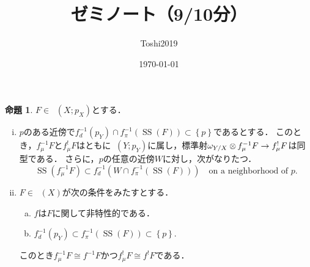 \documentclass[leqno, 10pt, a4paper, dvipdfmx]{jsarticle}
\title{ゼミノート（9/10分）}
\author{Toshi2019}
\date{\today}
\theoremstyle{definition}
\numberwithin{equation}{section}
\newcommand{\Dompb}{\mathop{\mathsf{D}^\mathrm{b}}\nolimits}
\newcommand{\muS}{\mathop{\mathrm{SS}}\nolimits}
\newcommand{\tens}[1][]{\mathbin{\otimes_{\raise1.5ex\hbox to-.1em{}{#1}}}}
\theoremstyle{mystyle}
\newtheorem{PRP}[AXM]{命題}
\renewenvironment{leftbar}{%
  \def\FrameCommand{\textcolor{lightgray}{\vrule width 4pt} \hspace{10pt}}%
  \MakeFramed {\advance\hsize-\width \FrameRestore}}%
{\endMakeFramed}
\newcommand{\mpb}[1][]{{#1}_{\pi}} %
\newcommand{\mdiff}[1][]{{#1}_{d}} %
\newcommand{\muinv}[1][]{{#1}_{\mu}^{-1}} %
\newcommand{\muexinv}[1][]{{#1}_{\mu}^{!}} %
\begin{document}
\maketitle

\begin{leftbar}
\begin{PRP}
    \(F\in\Dompb(X;p_X)\)とする．
\begin{enumerate}[(i)]
    \item \(p\)のある近傍で\(
        \mdiff[f]^{-1}(p_Y)\cap \mpb[f]^{-1}(\muS(F))
        \subset \left\{p\right\}
    \)であるとする．
    このとき，\(\muinv[f]F\)と\(\muexinv[f]F\)はともに\(
        \Dompb(Y;p_Y)
    \)に属し，標準射\(\omega_{Y/X}\tens[]\muinv[f]F\to\muexinv[f]F\)は同型である．
    さらに，\(p\)の任意の近傍\(W\)に対し，次がなりたつ．
    \begin{equation}\label{eq:6.1.26}
        \muS(\muinv[f]F)\subset \mdiff[f]^{-1}(W\cap \mpb[f]^{-1}(\muS(F)))\quad \text{on a neighborhood of \(p\).}
    \end{equation}\label{item:6.1.9-1}
    \item \(F\in\Dompb(X)\)が次の条件をみたすとする．\begin{enumerate}[(a)]
        \item \(f\)は\(F\)に関して非特性的である．\label{item:6.1.9-2a}
        \item \(\mdiff[f]^{-1}(p_Y)\subset \mpb[f]^{-1}(\muS(F))\subset \left\{p\right\}\).\label{item:6.1.9-2b}
    \end{enumerate}
    このとき\(\muinv[f]F\cong f^{-1}F\)かつ\(\muexinv[f]F\cong f^{!}F\)である．\label{item:6.1.9-2}
\end{enumerate}
\end{PRP}
\end{leftbar}
\end{document}
